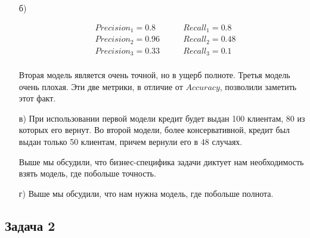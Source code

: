 \documentclass[12pt, a4paper, oneside]{article}
\begin{document}
{\begin{enumerate}
Посмотрим ещё один пример: если мы решаем задачу крединтого скоринга, нам нужно получить деньги назад после выдачи кредитов, иначе мы разоримся. Нам нужна модель, которая будет точно определять надёжного заёмщика. В этой ситуации для нас неважно покрыть все вражеские истребители снарядами (выдать кредиты каждому надёжному заёмщику), для нас важно сделать это точно. Поэтому основное внимание мы уделяем ошибке $FP$. 

Если мы пытаемся найти больных больной болезнью с болью и отправить их делать дополнительные анализы, для нас страшнее $FN$ ошибка. Если мы отправим лишнего человека на анализы, ничего страшного с ним не произойдёт. Если мы забудем проверить больного, он умрёт. Тут лучше добиться высокой полноты, при небольшой точности. 

В разных ситуациях ошибки имеют разные цены. $Accuracy$ не видит этого, поэтому на практике обычно используют $Precision$ и $Recall$. 

\item[б)]  

\begin{equation} 
\begin{aligned}
&Precision_1 =  0.8   \qquad &Recall_1 = 0.8 \\ 
&Precision_2 = 0.96  \qquad &Recall_2 = 0.48 \\ 
&Precision_3 = 0.33  \qquad &Recall_3 = 0.1  \\
\end{aligned}
\end{equation} 
		
Вторая модель является очень точной, но в ущерб полноте. Третья модель очень плохая. Эти две метрики, в отличие от $Accuracy$, позволили заметить этот факт. 
		
\item[в)] При использовании первой модели кредит будет выдан 100 клиентам, 80 из которых его вернут. Во второй модели, более консервативной, кредит был выдан только 50 клиентам, причем вернули его в 48 случаях. 

Выше мы обсудили, что бизнес-специфика задачи диктует нам необходимость взять модель, где побольше точность.

\item[г)]  Выше мы обсудили, что нам нужна модель, где побольше полнота.
\end{enumerate}
}



\subsection*{Задача 2}
\end{document}

